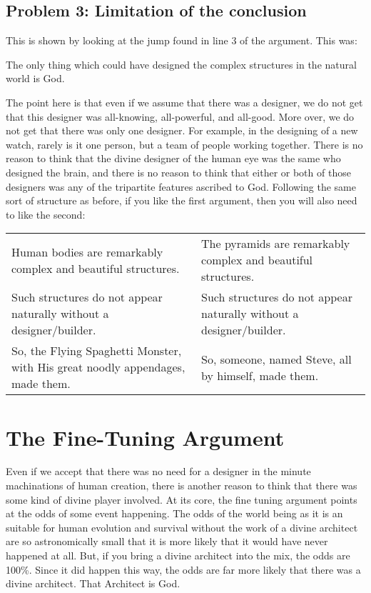 \subsection{Problem 3: Limitation of the conclusion}

This is shown by looking at the jump found in line 3 of the argument. This was:

    \begin{center}The only thing which could have designed the complex structures in the natural world is God.\end{center}

The point here is that even if we assume that there was a designer, we do not get that this designer was all-knowing, all-powerful, and all-good. More over, we do not get that there was only one designer. For example, in the designing of a new watch, rarely is it one person, but a team of people working together. There is no reason to think that the divine designer of the human eye was the same who designed the brain, and there is no reason to think that either or both of those designers was any of the tripartite features ascribed to God. Following the same sort of structure as before, if you like the first argument, then you will also need to like the second:

\begin{tabular}{p{1.75in}|p{1.75in}}
    Human bodies are remarkably complex and beautiful structures.&The pyramids are remarkably complex and beautiful structures.\\
    Such structures do not appear naturally without a designer/builder.&Such structures do not appear naturally without a designer/builder.\\
    So, the Flying Spaghetti Monster, with His great noodly appendages, made them.&So, someone, named Steve, all by himself, made them.
\end{tabular}

\section{The Fine-Tuning Argument}
Even if we accept that there was no need for a designer in the minute machinations of human creation, there is another reason to think that there was some kind of divine player involved. At its core, the fine tuning argument points at the odds of some event happening. The odds of the world being as it is an suitable for human evolution and survival without the work of a divine architect are so astronomically small that it is more likely that it would have never happened at all. But, if you bring a divine architect into the mix, the odds are 100\%. Since it did happen this way, the odds are far more likely that there was a divine architect. That Architect is God.

